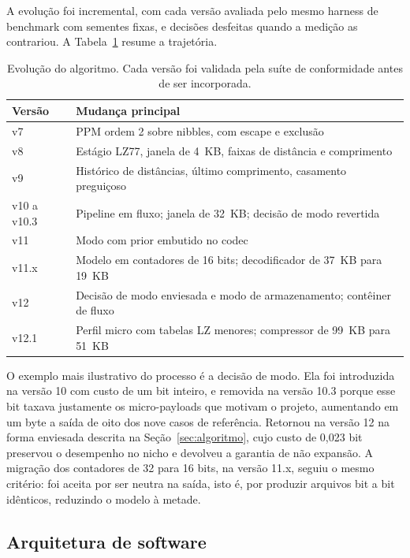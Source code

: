 \documentclass[12pt]{article}
\begin{document}
A evolução foi incremental, com cada versão avaliada pelo mesmo harness de
benchmark com sementes fixas, e decisões desfeitas quando a medição as
contrariou. A Tabela~\ref{tab:versoes} resume a trajetória.

\begin{table}[ht]
\centering
\caption{Evolução do algoritmo. Cada versão foi validada pela suíte de
  conformidade antes de ser incorporada.}
\label{tab:versoes}
\small
\begin{tabular}{ll}
\toprule
\textbf{Versão} & \textbf{Mudança principal} \\
\midrule
v7 & PPM ordem 2 sobre nibbles, com escape e exclusão \\
v8 & Estágio LZ77, janela de 4~KB, faixas de distância e comprimento \\
v9 & Histórico de distâncias, último comprimento, casamento preguiçoso \\
v10 a v10.3 & Pipeline em fluxo; janela de 32~KB; decisão de modo revertida \\
v11 & Modo com prior embutido no codec \\
v11.x & Modelo em contadores de 16 bits; decodificador de 37~KB para 19~KB \\
v12 & Decisão de modo enviesada e modo de armazenamento; contêiner de fluxo \\
v12.1 & Perfil micro com tabelas LZ menores; compressor de 99~KB para 51~KB \\
\bottomrule
\end{tabular}
\end{table}

O exemplo mais ilustrativo do processo é a decisão de modo. Ela foi introduzida
na versão 10 com custo de um bit inteiro, e removida na versão 10.3 porque esse
bit taxava justamente os micro-payloads que motivam o projeto, aumentando em um
byte a saída de oito dos nove casos de referência. Retornou na versão 12 na
forma enviesada descrita na Seção~\ref{sec:algoritmo}, cujo custo de 0,023 bit
preservou o desempenho no nicho e devolveu a garantia de não expansão. A
migração dos contadores de 32 para 16 bits, na versão 11.x, seguiu o mesmo
critério: foi aceita por ser neutra na saída, isto é, por produzir arquivos bit
a bit idênticos, reduzindo o modelo à metade.

\subsection{Arquitetura de software}
\end{document}
